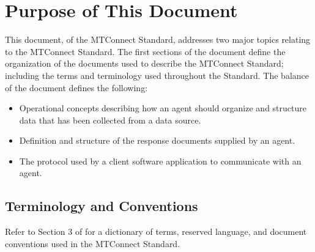 \section{Purpose of This Document}
\label{sec:Purpose of This Document}

This document,  of the MTConnect  Standard, addresses two major topics relating to the MTConnect Standard.  The first sections of the document define the organization of the documents used to describe the MTConnect Standard; including the terms and terminology used throughout the Standard.  The balance of the document defines the following:


\begin{itemize}
    \item Operational concepts describing how an \gls{agent} should organize and structure data that has been collected from a data source.

    \item Definition and structure of the \glspl{response document} supplied by an \gls{agent}.

    \item The protocol used by a client software application to communicate with an \gls{agent}.


\end{itemize}

\subsection{Terminology and Conventions}
\label{sec:Terminology and Conventions}

Refer to Section 3 of  for a dictionary of terms, reserved language, and document conventions used in the MTConnect Standard.

\printglossary[title=General Terms, type=general]
\printglossary[title=Information Model Terms, type=informationmodel]
\printglossary[title=Protocol Terms, type=protocol]
\printglossary[title=HTTP Terms, type=http]
\printglossary[title=XML Terms, type=xml]
\printglossary[title=Concept Model Terms, type=conceptmodel]

\printacronyms

\printbibliography[title=MTConnect References,keyword=MTC]

\printbibliography[title=Other References,notkeyword=MTC]

\glsaddall

